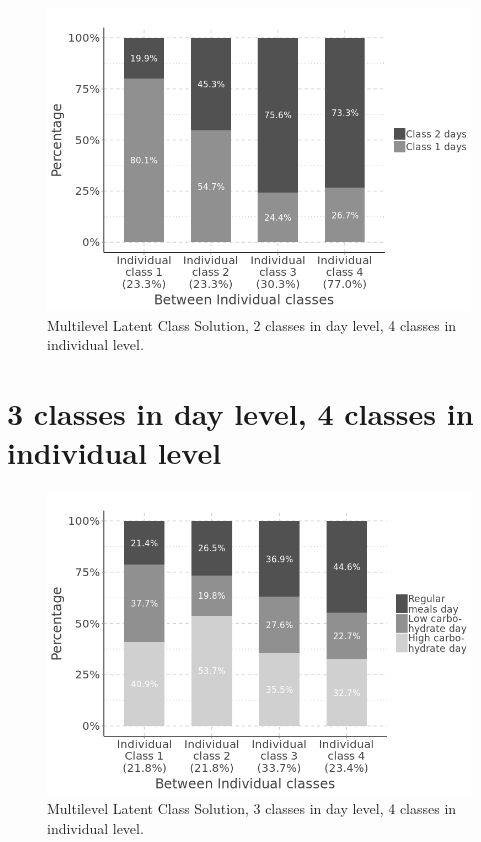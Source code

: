 \begin{figure}[H]
	\centering
	\includegraphics[width=13cm]{Figures/CW2CB4.png}
	\decoRule
	\caption[Multilevel Latent Class Solution (2 $\times$ 4).]{Multilevel Latent Class Solution, 2 classes in day level, 4 classes in individual level.}
	\label{fig:diary1}
\end{figure}

\section{3 classes in day level, 4 classes in individual level}\vspace{-0.3cm}

\begin{figure}[H]
	\centering
	\includegraphics[width=13cm]{Figures/CW3CB4.png}
	\decoRule
	\caption[Multilevel Latent Class Solution (3 $\times$ 4).]{Multilevel Latent Class Solution, 3 classes in day level, 4 classes in individual level.}
	\label{fig:diary1}
\end{figure}


